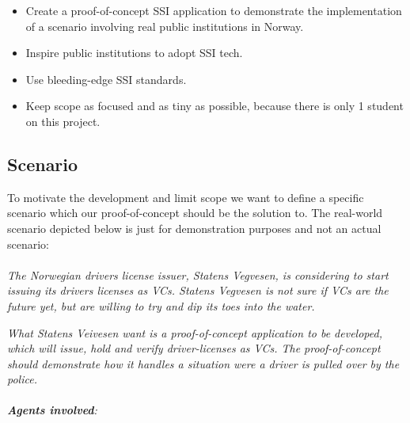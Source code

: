\begin{itemize}
\tightlist
\item
  Create a proof-of-concept SSI application to demonstrate the
  implementation of a scenario involving real public institutions in
  Norway.
\item
  Inspire public institutions to adopt SSI tech.
\item
  Use bleeding-edge SSI standards.
\item
  Keep scope as focused and as tiny as possible, because there is only 1
  student on this project.
\end{itemize}




\pagebreak



\hypertarget{scenario}{%
\subsection{Scenario}\label{scenario}}

To motivate the development and limit scope we want to define a specific
scenario which our proof-of-concept should be the solution to. The
real-world scenario depicted below is just for demonstration purposes
and not an actual scenario:

\paragraph{}

\emph{The Norwegian drivers license issuer, Statens Vegvesen, is
considering to start issuing its drivers licenses as VCs. Statens
Vegvesen is not sure if VCs are the future yet, but are willing to try
and dip its toes into the water.}

\emph{What Statens Veivesen want is a proof-of-concept application to be
developed, which will issue, hold and verify driver-licenses as VCs. The
proof-of-concept should demonstrate how it handles a situation were a
driver is pulled over by the police.}

\paragraph{}

\emph{\textbf{Agents involved}:}

